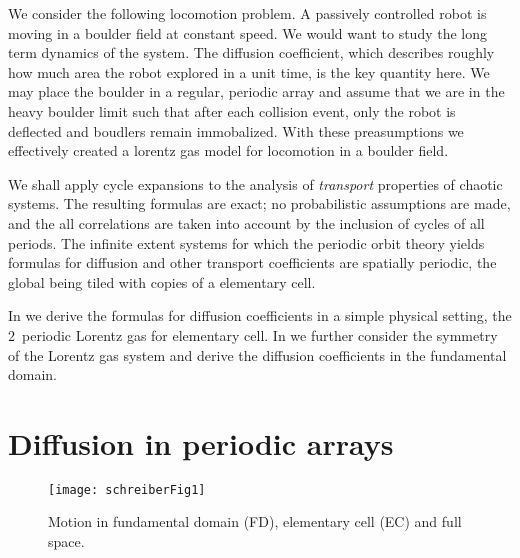 \documentclass[aps,pre,preprint,groupedaddress, floatfix]{revtex4-1}
\begin{document}
We consider the following locomotion problem. A passively controlled robot is moving in a boulder field at constant speed. We would want to study the long term dynamics of the system. The diffusion coefficient, which describes roughly how much area the robot explored in a unit time, is the key quantity here. We may place the boulder in a regular, periodic array and assume that we are in the heavy boulder limit such that after each collision event, only the robot is deflected and boudlers remain immobalized. With these preasumptions we effectively created a lorentz gas model for locomotion in a boulder field.

We shall apply cycle expansions to the analysis of {\em transport} properties of
chaotic systems. The resulting formulas are exact; no probabilistic assumptions
are made, and the all correlations are taken into account by the inclusion of
cycles of all periods.  The infinite extent systems for which the periodic orbit
theory yields formulas for diffusion and other transport coefficients are
spatially periodic, the global {\statesp} being tiled with copies of a
elementary cell.

In  we derive the formulas for diffusion
coefficients in a simple physical setting, the $2$\dmn\ periodic Lorentz
gas for elementary cell. In we further consider the symmetry of the Lorentz gas system and derive the diffusion coefficients in the fundamental domain.

\section{Diffusion in periodic arrays}
\label{s-DiffPerArr}


\begin{figure}[htbp]
\begin{center}
\texttt{[image: schreiberFig1]}
\end{center}
\caption[]{\label{fig:schrieberFig1}}
Motion in fundamental domain (FD), elementary cell (EC) and full space.
\end{figure}
\end{document}

